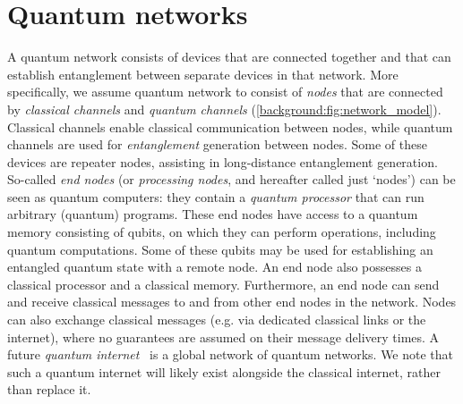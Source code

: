\section{Quantum networks}
A quantum network consists of devices that are connected together and that can establish entanglement between separate devices in that network.
More specifically, we assume quantum network to consist of \textit{nodes} that are connected by \textit{classical channels} and \textit{quantum channels} (\cref{background:fig:network_model}).
Classical channels enable classical communication between nodes, while quantum channels are used for \textit{entanglement} generation between nodes.
Some of these devices are repeater nodes, assisting in long-distance entanglement generation.
So-called \textit{end nodes} (or \textit{processing nodes}, and hereafter called just `nodes') can be seen as quantum computers:
they contain a \textit{quantum processor} that can run arbitrary (quantum) programs.
These end nodes have access to a quantum memory consisting of qubits, on which they can perform operations, including quantum computations.
Some of these qubits may be used for establishing an entangled quantum state with a remote node.
An end node also possesses a classical processor and a classical memory.
Furthermore, an end node can send and receive classical messages to and from other end nodes in the network.
Nodes can also exchange classical messages (e.g. via dedicated classical links or the internet), where no guarantees are assumed on their message delivery times. 
A future \textit{quantum internet}~\cite{Wehner2018stages, kimble2008quantum} is a global network of quantum networks.
We note that such a quantum internet will likely exist alongside the classical internet, rather than replace it.

